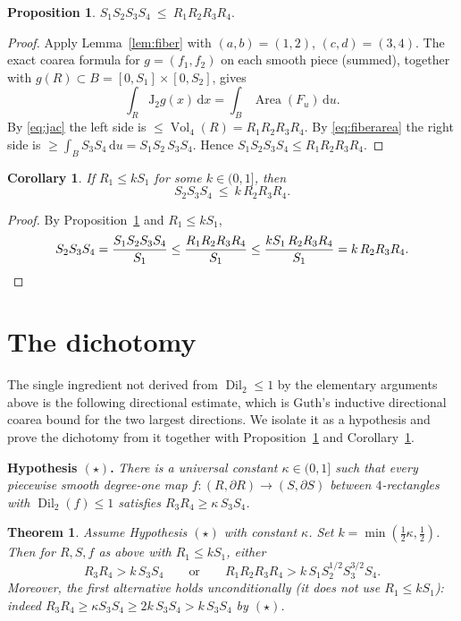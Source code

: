 \documentclass[11pt]{article}
\newtheorem{theorem}{Theorem}
\newtheorem{proposition}{Proposition}
\newtheorem{corollary}{Corollary}
\theoremstyle{remark}
\newcommand{\Vol}{\operatorname{Vol}}
\newcommand{\Dil}{\operatorname{Dil}}
\newcommand{\Area}{\operatorname{Area}}
\newcommand{\dd}{\mathrm{d}}
\newcommand{\Jac}{\mathrm{J}}
\begin{document}
\begin{proposition}\label{prop:vol}
$\displaystyle S_1S_2S_3S_4\ \le\ R_1R_2R_3R_4 .$
\end{proposition}

\begin{proof}
Apply Lemma~\ref{lem:fiber} with $(a,b)=(1,2)$, $(c,d)=(3,4)$. The exact coarea formula for
$g=(f_1,f_2)$ on each smooth piece (summed), together with $g(R)\subset B=[0,S_1]\times[0,S_2]$, gives
\begin{equation}\label{eq:coarea}
\int_R\Jac_2 g(x)\,\dd x=\int_B\Area(F_u)\,\dd u .
\end{equation}
By \eqref{eq:jac} the left side is $\le\Vol_4(R)=R_1R_2R_3R_4$. By \eqref{eq:fiberarea} the
right side is $\ge\int_B S_3S_4\,\dd u=S_1S_2\,S_3S_4$. Hence
$S_1S_2S_3S_4\le R_1R_2R_3R_4$.
\end{proof}

\begin{corollary}\label{cor:three}
If $R_1\le kS_1$ for some $k\in(0,1]$, then
\begin{equation}\label{eq:three}
S_2S_3S_4\ \le\ k\,R_2R_3R_4 .
\end{equation}
\end{corollary}

\begin{proof}
By Proposition~\ref{prop:vol} and $R_1\le kS_1$,
\[
S_2S_3S_4=\frac{S_1S_2S_3S_4}{S_1}\le\frac{R_1R_2R_3R_4}{S_1}\le\frac{kS_1\,R_2R_3R_4}{S_1}
=k\,R_2R_3R_4 . \qedhere
\]
\end{proof}

\section{The dichotomy}

The single ingredient not derived from $\Dil_2\le1$ by the elementary arguments above is the
following directional estimate, which is Guth's inductive directional coarea bound for the
two largest directions. We isolate it as a hypothesis and prove the dichotomy from it
together with Proposition~\ref{prop:vol} and Corollary~\ref{cor:three}.

\medskip
\noindent\textbf{Hypothesis $(\star)$.} \emph{There is a universal constant
$\kappa\in(0,1]$ such that every piecewise smooth degree-one map
$f\colon(R,\partial R)\to(S,\partial S)$ between $4$-rectangles with $\Dil_2(f)\le1$
satisfies $R_3R_4\ge\kappa\,S_3S_4$.}

\begin{theorem}\label{thm:main}
Assume Hypothesis $(\star)$ with constant $\kappa$. Set $k=\min(\tfrac12\kappa,\tfrac12)$.
Then for $R,S,f$ as above with $R_1\le kS_1$, either
\[
R_3R_4>k\,S_3S_4\qquad\text{or}\qquad R_1R_2R_3R_4>k\,S_1S_2^{1/2}S_3^{3/2}S_4 .
\]
Moreover, the first alternative holds \emph{unconditionally} (it does not use
$R_1\le kS_1$): indeed $R_3R_4\ge\kappa S_3S_4\ge2k\,S_3S_4>k\,S_3S_4$ by $(\star)$.
\end{theorem}
\end{document}
